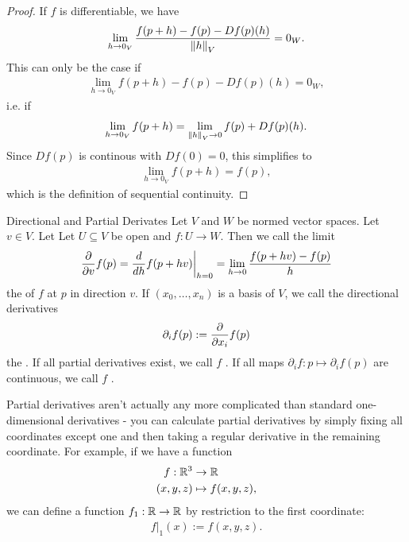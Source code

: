 \begin{proof}
	If $f$ is differentiable, we have
	\begin{align*}
		\lim_{h \to 0_V} \frac{f(p+h) - f(p) - Df(p)(h)}{\norm{h}_V} = 0_W.
	\end{align*}
	This can only be the case if
	\begin{align*}
		\lim_{h \to 0_V} f(p+h) - f(p) - Df(p)(h) = 0_W,
	\end{align*}
	i.e. if
	\begin{align*}
		\lim_{h \to 0_V} f(p+h) = \lim_{\norm{h}_V \to 0} f(p) + Df(p)(h).
	\end{align*}
	Since $Df(p)$ is continous with $Df(0) = 0$, this simplifies to
	\begin{align*}
		\lim_{h \to 0_V} f(p+h) = f(p),
	\end{align*}
	which is the definition of sequential continuity.
\end{proof}
\begin{importantdefinition}{Directional and Partial Derivates}{}
	Let $V$ and $W$ be normed vector spaces. Let $v \in V$. Let Let $U \subseteq V$ be open and $f : U \to W$. Then we call the limit
	\begin{align*}
		\pderivative{v} f(p) = \frac{d}{dh} f(p + hv) \bigg |_{h = 0} = \lim_{h \to 0} \frac{f(p + hv) - f(p)}{h}
	\end{align*}
	the  of $f$ at $p$ in direction $v$. If $(x_0, \hdots, x_n)$ is a basis of $V$, we call the directional derivatives
	\begin{align*}
		\partial_i f(p) := \pderivative{x_i} f(p) 
	\end{align*}
	the . If all partial derivatives exist, we call $f$ . If all maps $\partial_i f : p \mapsto \partial_if(p)$ are continuous, we call $f$ .
\end{importantdefinition}
Partial derivatives aren't actually any more complicated than standard one-dimensional derivatives - you can calculate partial derivatives by simply fixing all coordinates except one and then taking a regular derivative in the remaining coordinate. For example, if we have a function
\begin{align*}
	f : \mathbb{R}^3 &\to \mathbb{R}\\
		(x,y,z) &\mapsto f(x,y,z),
\end{align*}
we can define a function $f_1 : \mathbb{R} \to \mathbb{R}$ by restriction to the first coordinate:
\begin{align*}
	f|_1(x) := f(x,y,z).
\end{align*}
